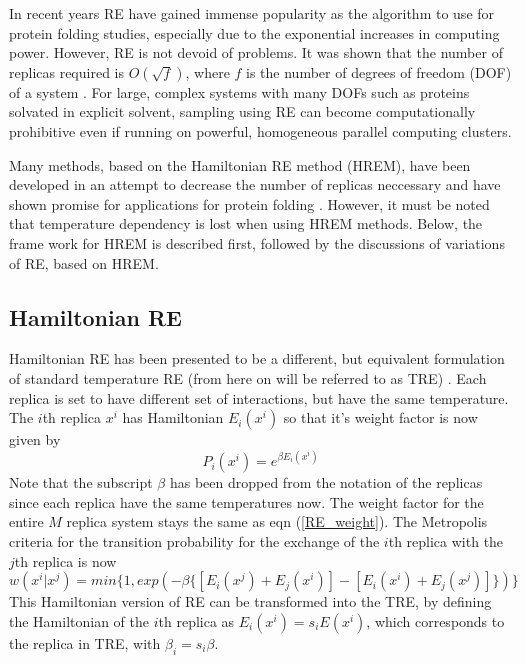 \documentclass[12pt]{article}
\numberwithin{equation}{subsection}
\begin{document}
\begin{spacing}{1}
In recent years RE have gained immense popularity as the algorithm to use for protein folding studies, especially due to the exponential increases in computing power. However, RE is not devoid of problems.  It was shown that the number of replicas required is $O(\sqrt{f})$, where $f$ is the number of degrees of freedom (DOF) of a system \cite{fukun}. For large, complex systems with many DOFs such as proteins solvated in explicit solvent, sampling using RE can become computationally prohibitive even if running on powerful, homogeneous parallel computing clusters. 

Many methods, based on the Hamiltonian RE method (HREM), have been developed in an attempt to decrease the number of replicas neccessary and have shown promise for applications for protein folding \cite{rest,kannan}. However, it must be noted that temperature dependency is lost when using HREM methods. Below, the frame work for HREM is described first, followed by the discussions of variations of RE, based on HREM.

\subsection{Hamiltonian RE}
Hamiltonian RE has been presented to be a different, but equivalent formulation of standard temperature RE (from here on will be referred to as TRE) \cite{fukun}. Each replica is set to have different set of interactions, but have the same temperature. The $i$th replica $x^i$ has Hamiltonian $E_i(x^i)$ so that it's weight factor is now given by 
\begin{equation}
P_i(x^i) = e^{\beta E_i(x^i)}
\end{equation}
Note that the subscript $\beta$ has been dropped from the notation of the replicas since each replica have the same temperatures now. The weight factor for the entire $M$ replica system stays the same as eqn (\ref{RE_weight}). The Metropolis criteria for the transition probability for the exchange of the $i$th replica with the $j$th replica is now
\begin{equation}
w(x^i | x^j) = min\{1, exp(-\beta\{[E_i(x^j) + E_j(x^i)]-[E_i(x^i)+E_j(x^j)]\})\}
\end{equation}
This Hamiltonian version of RE can be transformed into the TRE, by defining the Hamiltonian of the $i$th replica as $E_i(x^i) = s_iE(x^i)$, which corresponds to the replica in TRE, with $\beta_i = s_i\beta$.


\end{spacing}
\end{document}
